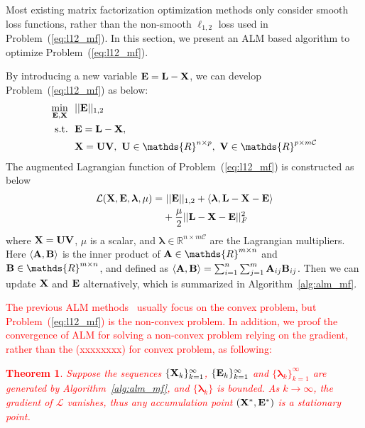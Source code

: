 \documentclass[10pt,twocolumn,letterpaper]{article}
\newtheorem{theorem}{Theorem}
\def\bB{{\bf B}}
\def\bE{{\bf E}}
\def\blambda{{\bm \lambda}}
\def\calL{{\mathcal{L}}}
\def\calC{{\mathcal{C}}}
\def\bL{{\bf L}}
\def\bU{{\bf U}}
\def\bV{{\bf V}}
\def\dsR{\mathds{R}}
\def\bX{{\bf X}}
\def\bA{{\bf A}}
\def\bX{{\bf X}}
\def\st{{\text{s.t.}}}
\def\yanred{\textcolor{red}}
\begin{document}
Most existing matrix factorization optimization methods only consider smooth loss functions, rather than the non-smooth $\ell_{1,2}$ loss used in Problem~(\ref{eq:l12_mf}).
In this section, we present an ALM based algorithm to optimize Problem~(\ref{eq:l12_mf}).


By introducing a new variable $\bE = \bL - \bX$, we can develop Problem~(\ref{eq:l12_mf}) as below:
{\small
\begin{align}\label{eq:mf_l21_constrained}
  \min_{\bE, \bX} ~&~ || \bE ||_{1,2}      \nonumber \\
  \st             ~&~ \bE = \bL - \bX  ,   \nonumber \\
                  ~&~ \bX = \bU \bV,~\bU \in \dsR^{n \times p},~\bV \in \dsR^{p \times m \calC}
\end{align}
}
\noindent 
The augmented Lagrangian function of Problem~(\ref{eq:l12_mf}) is constructed as below
{\small
\begin{align}\label{eq:lagrangian_l21}
  \calL (\bX, \bE, \blambda, \mu) = &~ || \bE ||_{1,2} + \langle \blambda, \bL - \bX - \bE \rangle      \nonumber \\
                                    & + \frac{\mu}{2} || \bL - \bX - \bE ||_F^2
\end{align}
}
\noindent
where $\bX = \bU \bV$, $\mu$ is a scalar,
and $\blambda \in \dsR^{n \times m\calC}$ are the Lagrangian multipliers.
Here $\langle \bA, \bB \rangle$ is the inner product of $\bA \in \dsR^{m \times n}$ and $\bB \in \dsR^{m \times n}$, and defined as $\langle \bA, \bB \rangle = \sum_{i=1}^{n} \sum_{j=1}^{m} \bA_{ij} \bB_{ij}$.
Then we can update $\bX$ and $\bE$ alternatively, which is summarized in Algorithm~\ref{alg:alm_mf}.

\yanred{
The previous ALM methods~\cite{liu2013robust} usually focus on the convex problem,
but Problem~(\ref{eq:l12_mf}) is the non-convex problem.
In addition, we proof the convergence of ALM for solving a non-convex problem relying on the gradient,
rather than the (xxxxxxxx) for convex problem,
as following:
}

\yanred{
\begin{theorem}
\label{theorem:alm_convergence}
  Suppose the sequences $\{\bX_k\}_{k=1}^{\infty}$, $\{\bE_k\}_{k=1}^{\infty}$ and $\{\blambda_k\}_{k=1}^{\infty}$ are generated by Algorithm~\ref{alg:alm_mf},
  and $\{\blambda_k\}$ is bounded.
  As $k \to \infty$, the gradient of $\calL$ vanishes,
  thus any accumulation point $(\bX^*, \bE^*)$ is a stationary point.
\end{theorem}
}
\end{document}
